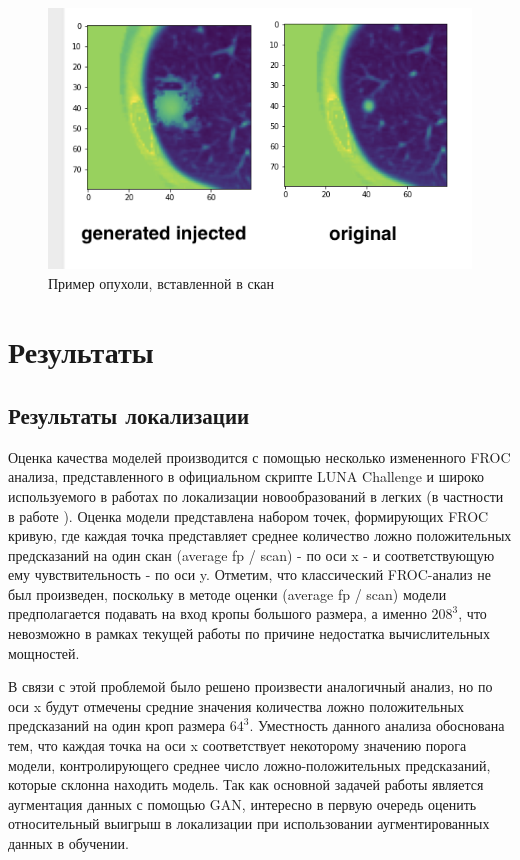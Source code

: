 \begin{figure}[!h]
\includegraphics[width=\linewidth]{images/gan-injections/1.png}
\caption{Пример опухоли, вставленной в скан}\label{injection}
\centering
\end{figure}

\section{Результаты}

\subsection{Результаты локализации}

Оценка качества моделей производится с помощью несколько измененного FROC анализа, представленного в официальном скрипте LUNA Challenge \cite{luna} и широко используемого в работах по локализации новообразований в легких (в частности в работе \cite{li2019deepseed}). Оценка модели представлена набором точек, формирующих FROC кривую, где каждая точка представляет среднее количество ложно положительных предсказаний на один скан (average fp / scan) - по оси x - и соответствующую ему чувствительность - по оси y. Отметим, что классический FROC-анализ не был произведен, поскольку в методе оценки (average fp  / scan) \cite{luna} модели предполагается подавать на вход кропы большого  размера, а именно $208^3$, что невозможно в рамках текущей работы по причине недостатка вычислительных мощностей.

В связи с этой проблемой было решено произвести аналогичный анализ, но по оси x будут отмечены средние значения количества ложно положительных предсказаний на один кроп размера $64^3$. Уместность данного анализа обоснована тем, что каждая точка на оси x соответствует некоторому значению порога модели, контролирующего среднее число ложно-положительных предсказаний, которые склонна находить модель. Так как основной задачей работы является аугментация данных с помощью GAN, интересно в первую очередь оценить относительный выигрыш в локализации при использовании аугментированных данных в обучении.


